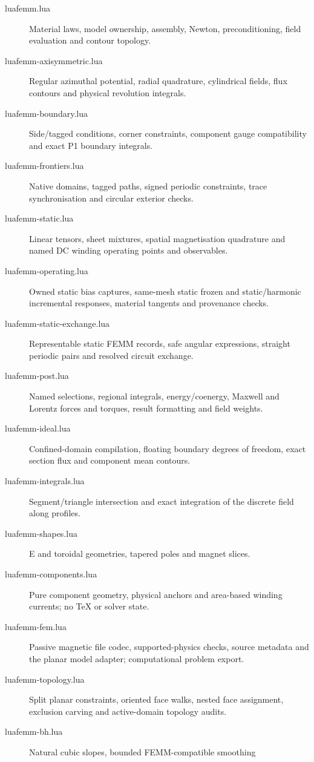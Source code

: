\begin{description}
\item[luafemm.lua] Material laws, model ownership, assembly, Newton,
  preconditioning, field evaluation and contour topology.
\item[luafemm-axisymmetric.lua] Regular azimuthal potential, radial quadrature,
  cylindrical fields, flux contours and physical revolution integrals.
\item[luafemm-boundary.lua] Side/tagged conditions, corner constraints, component gauge
  compatibility and exact P1 boundary integrals.
\item[luafemm-frontiers.lua] Native domains, tagged paths, signed periodic
  constraints, trace synchronisation and circular exterior checks.
\item[luafemm-static.lua] Linear tensors, sheet mixtures, spatial magnetisation
  quadrature and named DC winding operating points and observables.
\item[luafemm-operating.lua] Owned static bias captures, same-mesh static frozen
  and static/harmonic incremental responses, material tangents and provenance checks.
\item[luafemm-static-exchange.lua] Representable static FEMM records, safe
  angular expressions, straight periodic pairs and resolved circuit exchange.
\item[luafemm-post.lua] Named selections, regional integrals, energy/coenergy,
  Maxwell and Lorentz forces and torques, result formatting and field weights.
\item[luafemm-ideal.lua] Confined-domain compilation, floating boundary
  degrees of freedom, exact section flux and component mean contours.
\item[luafemm-integrals.lua] Segment/triangle intersection and exact integration
  of the discrete field along profiles.
\item[luafemm-shapes.lua] E and toroidal geometries, tapered poles and magnet slices.
\item[luafemm-components.lua] Pure component geometry, physical anchors and
  area-based winding currents; no TeX or solver state.
\item[luafemm-fem.lua] Passive magnetic file codec, supported-physics checks,
  source metadata and the planar model adapter; computational problem export.
\item[luafemm-topology.lua] Split planar constraints, oriented face walks,
  nested face assignment, exclusion carving and active-domain topology audits.
\item[luafemm-bh.lua] Natural cubic slopes, bounded FEMM-compatible smoothing

\end{description}
